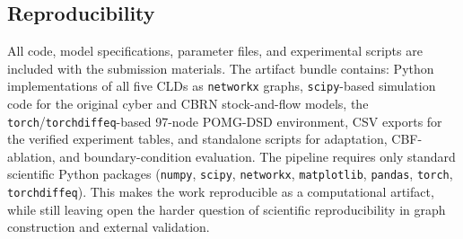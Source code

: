\documentclass[11pt]{article}
\begin{document}
\subsection{Reproducibility}

All code, model specifications, parameter files, and experimental scripts are included with the submission materials. The artifact bundle contains: Python implementations of all five CLDs as \texttt{networkx} graphs, \texttt{scipy}-based simulation code for the original cyber and CBRN stock-and-flow models, the \texttt{torch}/\texttt{torchdiffeq}-based 97-node POMG-DSD environment, CSV exports for the verified experiment tables, and standalone scripts for adaptation, CBF-ablation, and boundary-condition evaluation. The pipeline requires only standard scientific Python packages (\texttt{numpy}, \texttt{scipy}, \texttt{networkx}, \texttt{matplotlib}, \texttt{pandas}, \texttt{torch}, \texttt{torchdiffeq}). This makes the work reproducible as a computational artifact, while still leaving open the harder question of scientific reproducibility in graph construction and external validation.

\end{document}
